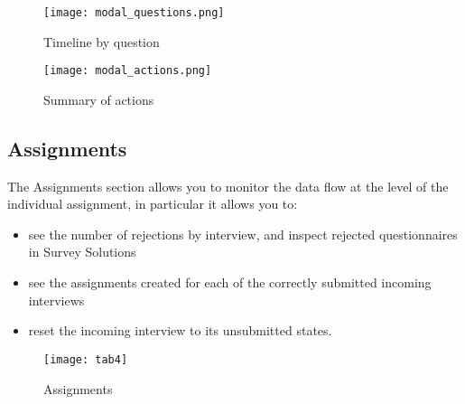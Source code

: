 \documentclass[a4paper]{article}
\providecommand{\tightlist}{%
  \setlength{\itemsep}{0pt}\setlength{\parskip}{0pt}}
\begin{document}
\begin{figure}
    \centering
    \begin{minipage}{0.48\textwidth}
        \centering
        \texttt{[image: modal\_questions.png]} %
        \caption{Timeline by question}
    \end{minipage}\hfill
    \begin{minipage}{0.48\textwidth}
        \centering
        \texttt{[image: modal\_actions.png]} %
        \caption{Summary of actions}
    \end{minipage}
\end{figure}
\newpage

\hypertarget{assignments}{%
\subsection{Assignments}\label{assignments}}

The Assignments section allows you to monitor the data flow at the level of the individual assignment, in particular it allows you to:

\begin{itemize}
\tightlist
\item
  see the number of rejections by interview, and inspect rejected questionnaires in Survey Solutions
\item
  see the assignments created for each of the correctly submitted incoming interviews
\item
  reset the incoming interview to its unsubmitted states.
\end{itemize}

\begin{figure}

{\centering \texttt{[image: tab4]} 

}

\caption{Assignments}\label{fig:tab4}
\end{figure}
\end{document}
